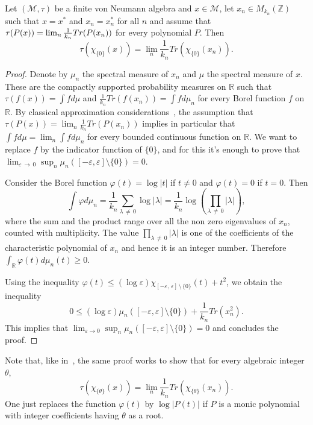 \documentclass[AHL,Unicode,longabstracts,published]{cedram}
\newcommand{\Rmath}{\mathbb{R}}
\newcommand{\Zmath}{\mathbb{Z}}
\newcommand{\cM}{\mathcal{M}}
\begin{document}
\begin{lemm}\label{lem:lueck_approximation}
Let $(\cM,\tau)$ be a finite von Neumann algebra and $x \in \cM$, let $x_n \in M_{k_n}(\Zmath)$ such that $x=x^*$ and $x_n=x_n^*$ for all $n$ and assume that $\tau(P(x))\linebreak= \lim_n \tfrac 1 {k_n} Tr(P(x_n))$ for every polynomial $P$. Then
\[
\tau\left(\chi_{\{0\}}(x)\right) = \lim_n \frac 1 {k_n} Tr\left(\chi_{\{0\}}(x_n)\right).
\]
\end{lemm}
\begin{proof}
Denote by $\mu_n$ the spectral measure of $x_n$ and $\mu$ the spectral measure of $x$. These are the compactly supported probability measures on $\Rmath$ such that $\tau(f(x))=\int fd\mu$ and $\frac{1}{k_n} Tr (f(x_n)) = \int f d\mu_n$ for every Borel function $f$ on $\Rmath$. By classical approximation considerations~\cite[Theorem~30.2]{billinglsey}, the assumption that $\tau(P(x)) = \lim_n \tfrac 1 {k_n} Tr (P(x_n))$ implies in particular that $\int f d\mu = \lim_n \int f d\mu_n$ for every bounded continuous function on $\Rmath$. We want to replace $f$ by the indicator function of $\{0\}$, and for this it's enough to prove that $\lim_{\varepsilon\,\to\,0} \sup_n \mu_n([-\varepsilon,\varepsilon]\setminus \{0\}) = 0$.

Consider the Borel function $\varphi(t) = \log |t|$ if $t \neq 0$ and $\varphi(t)=0$ if $t=0$. Then
\[
\int \varphi d\mu_n = \frac 1 {k_n} \sum_{\lambda\,\neq\,0} \log |\lambda|=\frac 1 {k_n} \log\left(\prod_{\lambda\,\neq\,0}|\lambda|\right),
\]
where the sum and the product range over all the non zero eigenvalues of $x_n$, counted with multiplicity. The value $\prod_{\lambda\,\neq\,0}|\lambda|$ is one of the coefficients of the characteristic polynomial of $x_n$ and hence it is an integer number. Therefore $ \int_\Rmath \varphi(t) d\mu_n(t)\geq 0$.


Using the inequality $\varphi(t) \leq (\log \varepsilon) \chi_{[-\varepsilon,\,\varepsilon]\,\setminus\,\{0\}}(t) + t^2$, we obtain the inequality
\[
0 \leq (\log \varepsilon) \mu_n\left([-\varepsilon,\varepsilon]\setminus \{0\}\right) + \frac{1}{k_n} Tr\left(x_n^2\right).
\]
This implies that $\lim_{\varepsilon \to 0} \sup_n \mu_n([-\varepsilon,\varepsilon]\setminus \{0\}) = 0$ and concludes the proof.
\end{proof}

Note that, like in~\cite{thom08}, the same proof works to show that for every algebraic integer $\theta$,
\[
\tau\left(\chi_{\{\theta\}}(x)\right) = \lim_n \frac 1 {k_n} Tr\left(\chi_{\{\theta\}}(x_n)\right).
\]
One just replaces the function $\varphi(t)$ by $\log|P(t)|$ if $P$ is a monic polynomial with integer coefficients having $\theta$ as a root.
\end{document}
